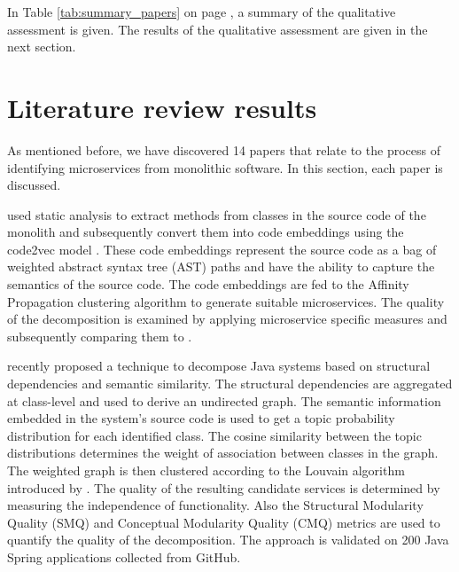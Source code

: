 In Table \ref{tab:summary_papers} on page \pageref{tab:summary_papers}, a summary of the qualitative assessment is given. The results of the qualitative assessment are given in the next section.




\section{Literature review results}\label{s:literature_results}
As mentioned before, we have discovered 14 papers that relate to the process of identifying microservices from monolithic software. In this section, each paper is discussed. \par

\citeauthor{al2021microservice} \cite{al2021microservice} used static analysis to extract methods from classes in the source code of the monolith and subsequently convert them into code embeddings using the code2vec model \cite{alon2019code2vec}. These code embeddings represent the source code as a bag of weighted abstract syntax tree (AST) paths and have the ability to capture the semantics of the source code. The code embeddings are fed to the Affinity Propagation clustering algorithm to generate suitable microservices. The quality of the decomposition is examined by applying microservice specific measures and subsequently comparing them to \cite{jin2018functionality, saidani2019towards}.\par
\citeauthor{brito2021identification} \cite{brito2021identification} recently proposed a technique to decompose Java systems based on structural dependencies and semantic similarity. The structural dependencies are aggregated at class-level and used to derive an undirected graph. The semantic information embedded in the system's source code is used to get a topic probability distribution for each identified class. The cosine similarity between the topic distributions determines the weight of association between classes in the graph. The weighted graph is then clustered according to the Louvain algorithm introduced by \citeauthor{blondel2008fast} \cite{blondel2008fast}. The quality of the resulting candidate services is determined by measuring the independence of functionality. Also the Structural Modularity Quality (SMQ) and Conceptual Modularity Quality (CMQ) metrics are used to quantify the quality of the decomposition. The approach is validated on 200 Java Spring applications collected from GitHub. \par
